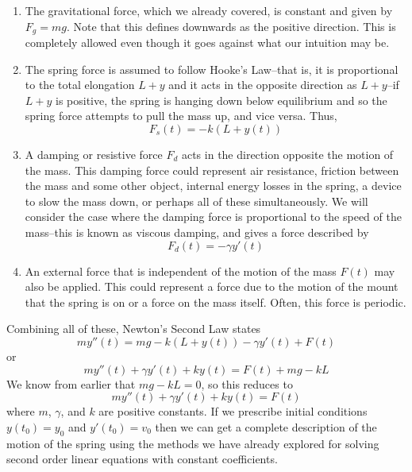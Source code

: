 \begin{enumerate}
    \item The gravitational force, which we already covered, is constant and given by $F_g = mg$. Note that this defines downwards as the positive direction. This is completely allowed even though it goes against what our intuition may be. 
    \item The spring force is assumed to follow Hooke's Law--that is, it is proportional to the total elongation $L+y$ and it acts in the opposite direction as $L+y$--if $L+y$ is positive, the spring is hanging down below equilibrium and so the spring force attempts to pull the mass up, and vice versa. Thus,
    \[F_s(t) = -k(L+y(t)) \]
    \item A damping or resistive force $F_d$ acts in the direction opposite the motion of the mass. This damping force could represent air resistance, friction between the mass and some other object, internal energy losses in the spring, a device to slow the mass down, or perhaps all of these simultaneously. We will consider the case where the damping force is proportional to the speed of the mass--this is known as viscous damping, and gives a force described by
    \[ F_d(t) = -\gamma y'(t) \]
    \item An external force that is independent of the motion of the mass $F(t)$ may also be applied. This could represent a force due to the motion of the mount that the spring is on or a force on the mass itself. Often, this force is periodic. 
\end{enumerate}
Combining all of these, Newton's Second Law states
\[ my''(t) = mg - k(L+y(t)) - \gamma y'(t) + F(t) \]
or 
\[ my''(t) + \gamma y'(t) + ky(t) = F(t) + mg - kL \]
We know from earlier that $mg-kL = 0$, so this reduces to
\[ my''(t) + \gamma y'(t) + ky(t) = F(t) \] 
where $m$, $\gamma$, and $k$ are positive constants. If we prescribe initial conditions $y(t_0) = y_0$ and $y'(t_0) = v_0$ then we can get a complete description of the motion of the spring using the methods we have already explored for solving second order linear equations with constant coefficients. 
